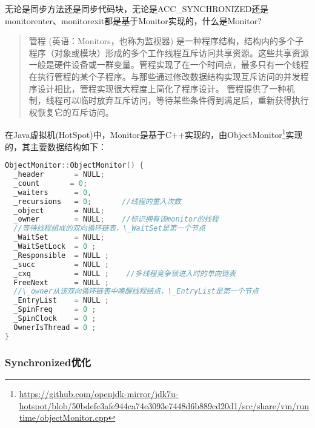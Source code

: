 \documentclass[../../../interview-questions.tex]{subfiles}
\begin{document}
无论是同步方法还是同步代码块，无论是ACC\_SYNCHRONIZED还是monitorenter、monitorexit都是基于Monitor实现的，什么是Monitor?

\begin{quotation}
管程 (英语：Monitors，也称为监视器) 是一种程序结构，结构内的多个子程序（对象或模块）形成的多个工作线程互斥访问共享资源。这些共享资源一般是硬件设备或一群变量。管程实现了在一个时间点，最多只有一个线程在执行管程的某个子程序。与那些通过修改数据结构实现互斥访问的并发程序设计相比，管程实现很大程度上简化了程序设计。 管程提供了一种机制，线程可以临时放弃互斥访问，等待某些条件得到满足后，重新获得执行权恢复它的互斥访问。
\end{quotation}

在Java虚拟机(HotSpot)中，Monitor是基于C++实现的，由ObjectMonitor\footnote{\url{https://github.com/openjdk-mirror/jdk7u-hotspot/blob/50bdefc3afe944ca74c3093e7448d6b889cd20d1/src/share/vm/runtime/objectMonitor.cpp}}实现的，其主要数据结构如下：

\begin{lstlisting}[language=C++]
ObjectMonitor::ObjectMonitor() {  
  _header       = NULL;  
  _count       = 0;  
  _waiters      = 0,  
  _recursions   = 0;       //线程的重入次数
  _object       = NULL;  
  _owner        = NULL;    //标识拥有该monitor的线程
  //等待线程组成的双向循环链表，\_WaitSet是第一个节点
  _WaitSet      = NULL;    
  _WaitSetLock  = 0 ;  
  _Responsible  = NULL ;  
  _succ         = NULL ;  
  _cxq          = NULL ;    //多线程竞争锁进入时的单向链表
  FreeNext      = NULL ;
  //\_owner从该双向循环链表中唤醒线程结点，\_EntryList是第一个节点  
  _EntryList    = NULL ;    
  _SpinFreq     = 0 ;  
  _SpinClock    = 0 ;  
  OwnerIsThread = 0 ;  
}
\end{lstlisting}

\subsubsection{Synchronized优化}
\end{document}
